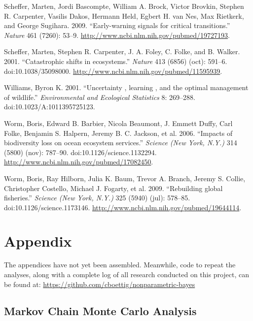 \documentclass[author-year, review]{elsarticle} %
\begin{document}
Scheffer, Marten, Jordi Bascompte, William A. Brock, Victor Brovkin,
Stephen R. Carpenter, Vasilis Dakos, Hermann Held, Egbert H. van Nes,
Max Rietkerk, and George Sugihara. 2009. ``Early-warning signals for
critical transitions.'' \emph{Nature} 461 (7260): 53--9.
\url{http://www.ncbi.nlm.nih.gov/pubmed/19727193}.

Scheffer, Marten, Stephen R. Carpenter, J. A. Foley, C. Folke, and B.
Walker. 2001. ``Catastrophic shifts in ecosystems.'' \emph{Nature} 413
(6856) (oct): 591--6. doi:10.1038/35098000.
\url{http://www.ncbi.nlm.nih.gov/pubmed/11595939}.

Williams, Byron K. 2001. ``Uncertainty , learning , and the optimal
management of wildlife.'' \emph{Environmental and Ecological Statistics}
8: 269--288. doi:10.1023/A:1011395725123.

Worm, Boris, Edward B. Barbier, Nicola Beaumont, J. Emmett Duffy, Carl
Folke, Benjamin S. Halpern, Jeremy B. C. Jackson, et al. 2006. ``Impacts
of biodiversity loss on ocean ecosystem services.'' \emph{Science (New
York, N.Y.)} 314 (5800) (nov): 787--90. doi:10.1126/science.1132294.
\url{http://www.ncbi.nlm.nih.gov/pubmed/17082450}.

Worm, Boris, Ray Hilborn, Julia K. Baum, Trevor A. Branch, Jeremy S.
Collie, Christopher Costello, Michael J. Fogarty, et al. 2009.
``Rebuilding global fisheries.'' \emph{Science (New York, N.Y.)} 325
(5940) (jul): 578--85. doi:10.1126/science.1173146.
\url{http://www.ncbi.nlm.nih.gov/pubmed/19644114}.


\pagebreak\pagebreak

\section{Appendix}

The appendices have not yet been assembled. Meanwhile, code to repeat
the analyses, along with a complete log of all research conducted on
this project, can be found at:
\href{https://github.com/cboettig/nonparametric-bayes/}{https://github.com/cboettig/nonparametric-bayes}

\subsection{Markov Chain Monte Carlo Analysis}
\end{document}
